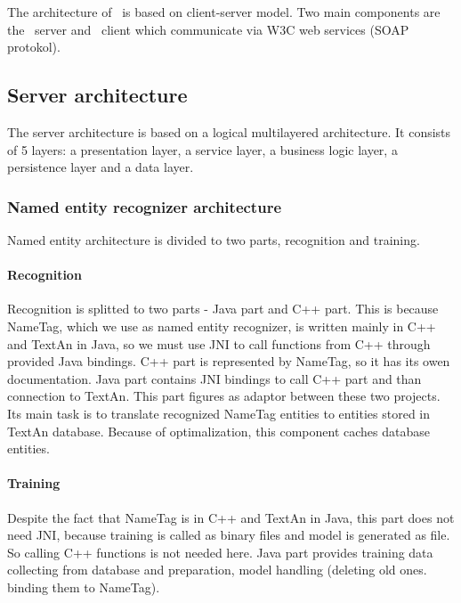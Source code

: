 

The architecture of \textan\ is based on client-server model. Two main components
are the \textan\ server and \textan\ client which communicate via W3C web services
(SOAP protokol).

\subsection{Server architecture}

The server architecture is based on a logical multilayered architecture. It
consists of 5 layers: a presentation layer, a service layer, a business logic layer, 
a persistence layer and a data layer.




\subsubsection{Named entity recognizer architecture}

Named entity architecture is divided to two parts, recognition and training.
\paragraph{Recognition} 
Recognition is splitted to two parts - Java part and C++ part. This is because NameTag, which we use as named entity recognizer, is written mainly in C++ and TextAn in Java, so we must use JNI to call functions from C++ through provided Java bindings. C++ part is represented by NameTag, so it has its owen documentation.
Java part contains JNI bindings to call C++ part and than connection to TextAn. This part figures as adaptor between these two projects. Its main task is to translate recognized NameTag entities to entities stored in TextAn database. Because of optimalization, this component caches database entities.

\paragraph{Training}
Despite the fact that NameTag is in C++ and TextAn in Java, this part does not need JNI, because training is called as binary files and model is generated as file. So calling C++ functions is not needed here. Java part provides training data collecting from database and preparation, model handling (deleting old ones. binding them to NameTag).


